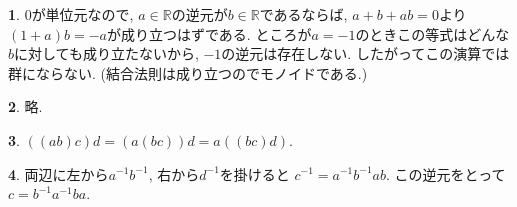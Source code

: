 \documentclass{amsart}
\theoremstyle{definition}
\newtheorem{ans}{}
\numberwithin{ans}{subsection}
\begin{document}
\begin{ans}
  $0$が単位元なので,
  $a \in \mathbb{R}$の逆元が$b \in \mathbb{R}$であるならば,
  $a + b + ab = 0$より$(1 + a)b = -a$が成り立つはずである.
  ところが$a = -1$のときこの等式はどんな$b$に対しても成り立たないから,
  $-1$の逆元は存在しない.
  したがってこの演算では群にならない.
  (結合法則は成り立つのでモノイドである.)
\end{ans}

\begin{ans}
  略.
\end{ans}

\begin{ans}
  $((ab)c)d = (a(bc))d = a((bc)d)$.
\end{ans}

\begin{ans}
  両辺に左から$a^{-1}b^{-1}$, 右から$d^{-1}$を掛けると
  $c^{-1} = a^{-1}b^{-1}ab$.
  この逆元をとって$c = b^{-1}a^{-1}ba$.
\end{ans}
\end{document}
